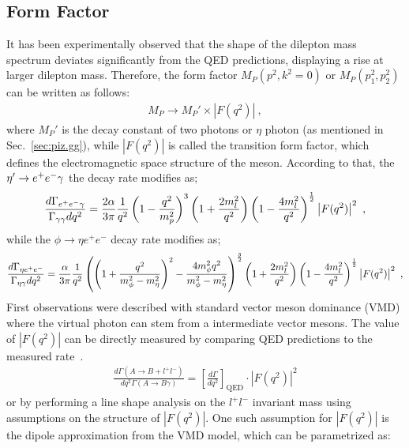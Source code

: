  \subsection{Form Factor}
   It has been experimentally observed that the shape of the dilepton mass spectrum deviates significantly from the QED predictions, displaying a rise at larger dilepton mass. Therefore, the form factor ${M}_P(p^2,k^2=0)$ or ${M}_P(p_{1}^2,p_{2}^2)$  can be written as follows:
  \begin{align}
  {M}_P \to {M}_P' \times \left|F(q^2)\right| \ ,
  \end{align}
  where $M_P'$ is the decay constant of two photons or $\eta$ photon (as mentioned in Sec.~\ref{sec:piz.gg}), while $\left|F(q^2)\right|$ is called the transition form factor, which defines the electromagnetic space structure of the meson. According to that, the $\eta^{\prime} \to e^+e^- \gamma$ the decay rate modifies as;
  \begin{align}\label{eq:eegff.final}
  \frac{d\Gamma_{e^+e^- \gamma}}{\Gamma_{\gamma\gamma} dq^2} = \frac{2 \alpha}{3 \pi} \frac{1}{q^2} \left( 1- \frac{q^2}{m_p^2}\right)^3 \left( 1+ \frac{2m_l^2}{q^2}\right) \left( 1- \frac{4m_l^2}{q^2}\right)^{\frac{1}{2}} \left|F(q^2)\right|^2 \ ,
  \end{align}
 while the $\phi \to \eta e^+e^-$ decay rate modifies as;
  \begin{align}
  \frac{d\Gamma_{\eta e^+e^-}}{\Gamma_{\eta\gamma} dq^2} = \frac{\alpha}{3 \pi} \frac{1}{q^2} \left( \left(1+ \frac{q^2}{m_{\phi}^2 - m_{\eta}^2} \right)^2 - \frac{4 m_{\phi}^2 q^2}{m_{\phi}^2 - m_{\eta}^2}\right)^\frac{3}{2} \left( 1+ \frac{2m_l^2}{q^2}\right) \left( 1- \frac{4m_l^2}{q^2}\right)^{\frac{1}{2}} \left|F(q^2)\right|^2 \ ,
  \end{align}
  First observations were described with standard vector meson dominance (VMD) where the virtual photon can stem from a intermediate vector mesons. 
  The value of $\left|F(q^2)\right|$ can be directly measured by comparing QED predictions to the measured rate~\cite{landsberg}. 
  \begin{align}
  \frac{d\Gamma(A\to B+l^+l^-)}{dq^2 \Gamma(A\to B\gamma)} = \left[\frac{d\Gamma}{dq^2}\right]_{\text{QED}} \cdot \left | F(q^2) \right |^2 
  \end{align}
  or by performing a line shape analysis on the $l^{+}l^{-}$ invariant mass using assumptions on the structure of $\left|F(q^2)\right|$. One such assumption for $\left|F(q^2)\right|$ is the dipole approximation from the VMD model, which can be parametrized as:
